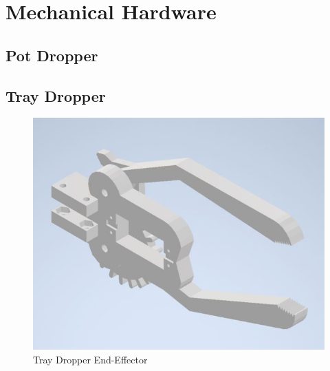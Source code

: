 \documentclass[12pt, titlepage]{article}
\begin{document}
\section{Mechanical Hardware}

\subsection{Pot Dropper}

\subsection{Tray Dropper}
\begin{figure}[H]
  \centering
  \includegraphics{Tray_Dropper.jpg}
  \caption{Tray Dropper End-Effector}
  \label{fig:dropper1}
\end{figure}
\end{document}

